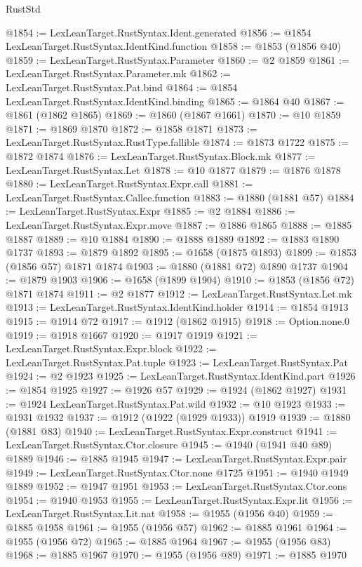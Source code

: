 \begin{lexlean}{RustStd}
\begin{coremodule}
{\begin{coremodule}
{{{{{{{{{{{{{{{{{{{{{{{{{{{{{@1854 := LexLeanTarget.RustSyntax.Ident.generated
@1856 := @1854 LexLeanTarget.RustSyntax.IdentKind.function
@1858 := @1853 (@1856 @40)
@1859 := LexLeanTarget.RustSyntax.Parameter
@1860 := @2 @1859
@1861 := LexLeanTarget.RustSyntax.Parameter.mk
@1862 := LexLeanTarget.RustSyntax.Pat.bind
@1864 := @1854 LexLeanTarget.RustSyntax.IdentKind.binding
@1865 := @1864 @40
@1867 := @1861 (@1862 @1865)
@1869 := @1860 (@1867 @1661)
@1870 := @10 @1859
@1871 := @1869 @1870
@1872 := @1858 @1871
@1873 := LexLeanTarget.RustSyntax.RustType.fallible
@1874 := @1873 @1722
@1875 := @1872 @1874
@1876 := LexLeanTarget.RustSyntax.Block.mk
@1877 := LexLeanTarget.RustSyntax.Let
@1878 := @10 @1877
@1879 := @1876 @1878
@1880 := LexLeanTarget.RustSyntax.Expr.call
@1881 := LexLeanTarget.RustSyntax.Callee.function
@1883 := @1880 (@1881 @57)
@1884 := LexLeanTarget.RustSyntax.Expr
@1885 := @2 @1884
@1886 := LexLeanTarget.RustSyntax.Expr.move
@1887 := @1886 @1865
@1888 := @1885 @1887
@1889 := @10 @1884
@1890 := @1888 @1889
@1892 := @1883 @1890 @1737
@1893 := @1879 @1892
@1895 := @1658 (@1875 @1893)
@1899 := @1853 (@1856 @57) @1871 @1874
@1903 := @1880 (@1881 @72) @1890 @1737
@1904 := @1879 @1903
@1906 := @1658 (@1899 @1904)
@1910 := @1853 (@1856 @72) @1871 @1874
@1911 := @2 @1877
@1912 := LexLeanTarget.RustSyntax.Let.mk
@1913 := LexLeanTarget.RustSyntax.IdentKind.holder
@1914 := @1854 @1913
@1915 := @1914 @72
@1917 := @1912 (@1862 @1915)
@1918 := Option.none.{0}
@1919 := @1918 @1667
@1920 := @1917 @1919
@1921 := LexLeanTarget.RustSyntax.Expr.block
@1922 := LexLeanTarget.RustSyntax.Pat.tuple
@1923 := LexLeanTarget.RustSyntax.Pat
@1924 := @2 @1923
@1925 := LexLeanTarget.RustSyntax.IdentKind.part
@1926 := @1854 @1925
@1927 := @1926 @57
@1929 := @1924 (@1862 @1927)
@1931 := @1924 LexLeanTarget.RustSyntax.Pat.wild
@1932 := @10 @1923
@1933 := @1931 @1932
@1937 := @1912 (@1922 (@1929 @1933)) @1919
@1939 := @1880 (@1881 @83)
@1940 := LexLeanTarget.RustSyntax.Expr.construct
@1941 := LexLeanTarget.RustSyntax.Ctor.closure
@1945 := @1940 (@1941 @40 @89) @1889
@1946 := @1885 @1945
@1947 := LexLeanTarget.RustSyntax.Expr.pair
@1949 := LexLeanTarget.RustSyntax.Ctor.none @1725
@1951 := @1940 @1949 @1889
@1952 := @1947 @1951
@1953 := LexLeanTarget.RustSyntax.Ctor.cons
@1954 := @1940 @1953
@1955 := LexLeanTarget.RustSyntax.Expr.lit
@1956 := LexLeanTarget.RustSyntax.Lit.nat
@1958 := @1955 (@1956 @40)
@1959 := @1885 @1958
@1961 := @1955 (@1956 @57)
@1962 := @1885 @1961
@1964 := @1955 (@1956 @72)
@1965 := @1885 @1964
@1967 := @1955 (@1956 @83)
@1968 := @1885 @1967
@1970 := @1955 (@1956 @89)
@1971 := @1885 @1970
}}}}}}}}}}}}}}}}}}}}}}}}}}}}}
\end{coremodule}}
\end{coremodule}
\end{lexlean}
